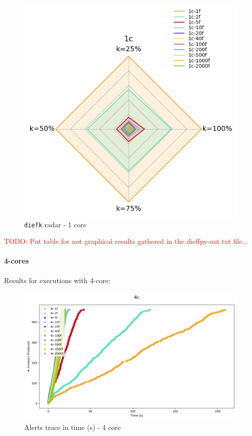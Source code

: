 \documentclass[12pt,a4paper]{article}
\begin{document}
\begin{figure}[H]
  \centering
  \includegraphics[scale = 0.5]{images/4-Experiments/E2/fixedcores/1c/radar-diefk.png}
  \caption{\texttt{diefk} radar - 1 core}
\end{figure}

\textcolor{red}{TODO: Put table for not graphical results gathered in the dieffpy-out.txt file...}

\paragraph{4-cores\\}

Results for executions with 4-core:

\begin{figure}[H]
  \centering
  \includegraphics[scale = 0.5]{images/4-Experiments/E2/fixedcores/4c/traces.png}
  \caption{Alerts trace in time (s) - 4 core}
\end{figure}
\end{document}
